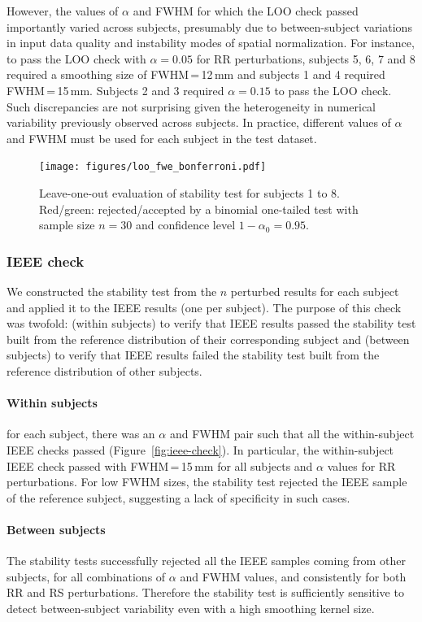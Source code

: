 \documentclass[lettersize,journal]{IEEEtran}
\begin{document}
{However, the values of $\alpha$ and FWHM for which the LOO check passed importantly varied across subjects, presumably due to between-subject variations in input data quality and instability modes of spatial normalization. For instance, to pass the LOO check with $\alpha=0.05$ for RR perturbations, subjects 5, 6, 7 and 8 required a smoothing size of FWHM\,=\,12\,mm and subjects 1 and 4 required FWHM\,=\,15\,mm. Subjects 2 and 3 required $\alpha=0.15$ to pass the LOO check. Such discrepancies are not surprising given the heterogeneity in numerical variability previously observed across subjects. In practice, different values of $\alpha$ and FWHM must be used for each subject in the test dataset.

\begin{figure}
  \centering
  \texttt{[image: figures/loo\_fwe\_bonferroni.pdf]}
  \caption{Leave-one-out evaluation of stability test for subjects 1 to 8.
    Red/green: rejected/accepted by a binomial one-tailed test with sample size $n=30$ and confidence level $1-\alpha_0=0.95$.}
  \label{fig:loo_bonferroni}
\end{figure}

\subsubsection{IEEE check}
\label{subsec:ieee_check}

We constructed the stability test from the $n$ perturbed results for each subject and applied it to the IEEE results (one per subject). The purpose of this check was twofold: (within subjects) to verify that IEEE results passed the stability test built from the reference distribution of their corresponding subject and (between subjects) to verify that IEEE results failed the stability test built from the reference distribution of other subjects.

\paragraph*{Within subjects} for each subject, there was an $\alpha$ and FWHM pair such that all the within-subject IEEE checks passed (Figure~\ref{fig:ieee-check}). In particular, the within-subject IEEE check passed with FWHM\,=\,15\,mm for all subjects and $\alpha$ values for RR perturbations. For low FWHM sizes, the stability test rejected the IEEE sample of the reference subject, suggesting a lack of specificity in such cases.

\paragraph*{Between subjects} The stability tests successfully rejected all the IEEE samples coming from other subjects, for all combinations of $\alpha$ and FWHM values, and consistently for both RR and RS perturbations. Therefore the stability test is sufficiently sensitive to detect between-subject variability even with a high smoothing kernel size.

}
\end{document}
